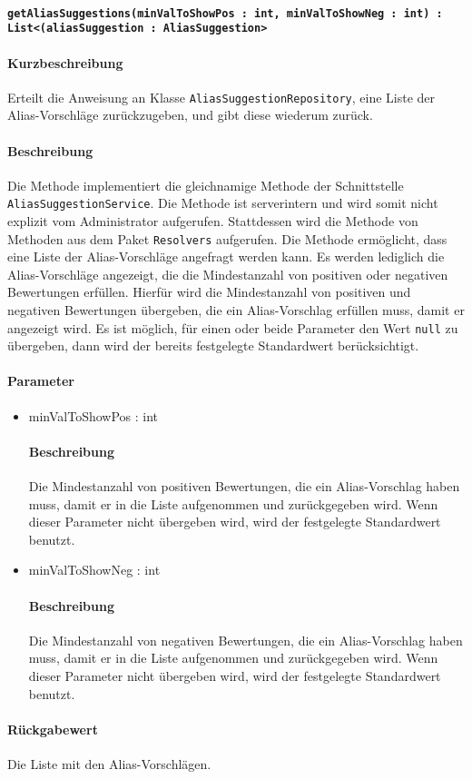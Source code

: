 \paragraph*{\texttt{getAliasSuggestions(minValToShowPos : int, minValToShowNeg : int) : List<(aliasSuggestion : AliasSuggestion>}}%
\paragraph*{Kurzbeschreibung}
Erteilt die Anweisung an Klasse \texttt{AliasSuggestionRepository}, eine Liste der Alias-Vorschläge zurückzugeben, und gibt diese wiederum zurück.
\paragraph*{Beschreibung}
Die Methode implementiert die gleichnamige Methode der Schnittstelle \texttt{AliasSuggestionService}.
Die Methode ist serverintern und wird somit nicht explizit vom Administrator aufgerufen.
Stattdessen wird die Methode von Methoden aus dem Paket \texttt{Resolvers} aufgerufen.
Die Methode ermöglicht, dass eine Liste der Alias-Vorschläge angefragt werden kann.
Es werden lediglich die Alias-Vorschläge angezeigt, die die Mindestanzahl von positiven oder negativen Bewertungen erfüllen.
Hierfür wird die Mindestanzahl von positiven und negativen Bewertungen übergeben, die ein Alias-Vorschlag erfüllen muss, damit er angezeigt wird.
Es ist möglich, für einen oder beide Parameter den Wert \texttt{null} zu übergeben, dann wird der bereits festgelegte Standardwert berücksichtigt.
\paragraph*{Parameter}
\begin{itemize}
	\item minValToShowPos : int
		\paragraph*{Beschreibung}
		Die Mindestanzahl von positiven Bewertungen, die ein Alias-Vorschlag haben muss, damit er in die Liste aufgenommen und zurückgegeben wird.
		Wenn dieser Parameter nicht übergeben wird, wird der festgelegte Standardwert benutzt.
	\item minValToShowNeg : int
		\paragraph*{Beschreibung}
		Die Mindestanzahl von negativen Bewertungen, die ein Alias-Vorschlag haben muss, damit er in die Liste aufgenommen und zurückgegeben wird. 
		Wenn dieser Parameter nicht übergeben wird, wird der festgelegte Standardwert benutzt.
\end{itemize}
\paragraph*{Rückgabewert}
Die Liste mit den Alias-Vorschlägen. 

